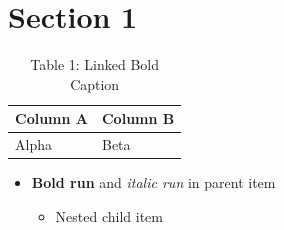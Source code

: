 \documentclass[11pt,a4paper]{article}
\begin{document}
\section{Section 1}

\begin{table}[h]
\caption{Table 1: Linked Bold Caption}
\begin{tabular}{|l|l|}
\hline
Column A & Column B \\ \hline
Alpha & Beta \\ \hline
\end{tabular}
\end{table}

\begin{itemize}
\item \textbf{Bold run} and \textit{italic run} in parent item
  \begin{itemize}
\item Nested child item
  \end{itemize}
\end{itemize}
\end{document}
